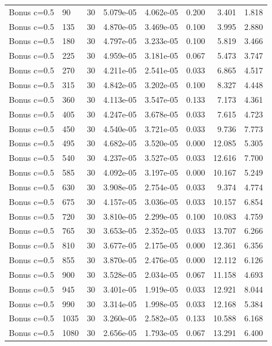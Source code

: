 \begin{scriptsize}
\begin{longtable}{llrrrrrr}
Bonus c=0.5 & 90 & 30 & 5.079e-05 & 4.062e-05 & 0.200 & 3.401 & 1.818 \\
Bonus c=0.5 & 135 & 30 & 4.870e-05 & 3.469e-05 & 0.100 & 3.995 & 2.880 \\
Bonus c=0.5 & 180 & 30 & 4.797e-05 & 3.233e-05 & 0.100 & 5.819 & 3.466 \\
Bonus c=0.5 & 225 & 30 & 4.959e-05 & 3.181e-05 & 0.067 & 5.473 & 3.747 \\
Bonus c=0.5 & 270 & 30 & 4.211e-05 & 2.541e-05 & 0.033 & 6.865 & 4.517 \\
Bonus c=0.5 & 315 & 30 & 4.842e-05 & 3.202e-05 & 0.100 & 8.327 & 4.448 \\
Bonus c=0.5 & 360 & 30 & 4.113e-05 & 3.547e-05 & 0.133 & 7.173 & 4.361 \\
Bonus c=0.5 & 405 & 30 & 4.247e-05 & 3.678e-05 & 0.033 & 7.615 & 4.723 \\
Bonus c=0.5 & 450 & 30 & 4.540e-05 & 3.721e-05 & 0.033 & 9.736 & 7.773 \\
Bonus c=0.5 & 495 & 30 & 4.682e-05 & 3.520e-05 & 0.000 & 12.085 & 5.305 \\
Bonus c=0.5 & 540 & 30 & 4.237e-05 & 3.527e-05 & 0.033 & 12.616 & 7.700 \\
Bonus c=0.5 & 585 & 30 & 4.092e-05 & 3.197e-05 & 0.000 & 10.167 & 5.249 \\
Bonus c=0.5 & 630 & 30 & 3.908e-05 & 2.754e-05 & 0.033 & 9.374 & 4.774 \\
Bonus c=0.5 & 675 & 30 & 4.157e-05 & 3.036e-05 & 0.033 & 10.157 & 6.854 \\
Bonus c=0.5 & 720 & 30 & 3.810e-05 & 2.299e-05 & 0.100 & 10.083 & 4.759 \\
Bonus c=0.5 & 765 & 30 & 3.653e-05 & 2.352e-05 & 0.033 & 13.707 & 6.266 \\
Bonus c=0.5 & 810 & 30 & 3.677e-05 & 2.175e-05 & 0.000 & 12.361 & 6.356 \\
Bonus c=0.5 & 855 & 30 & 3.870e-05 & 2.476e-05 & 0.000 & 12.112 & 6.126 \\
Bonus c=0.5 & 900 & 30 & 3.528e-05 & 2.034e-05 & 0.067 & 11.158 & 4.693 \\
Bonus c=0.5 & 945 & 30 & 3.401e-05 & 1.919e-05 & 0.033 & 12.921 & 8.044 \\
Bonus c=0.5 & 990 & 30 & 3.314e-05 & 1.998e-05 & 0.033 & 12.168 & 5.384 \\
Bonus c=0.5 & 1035 & 30 & 3.260e-05 & 2.582e-05 & 0.133 & 10.588 & 6.168 \\
Bonus c=0.5 & 1080 & 30 & 2.656e-05 & 1.793e-05 & 0.067 & 13.291 & 6.400 \\

\end{longtable}
\end{scriptsize}

